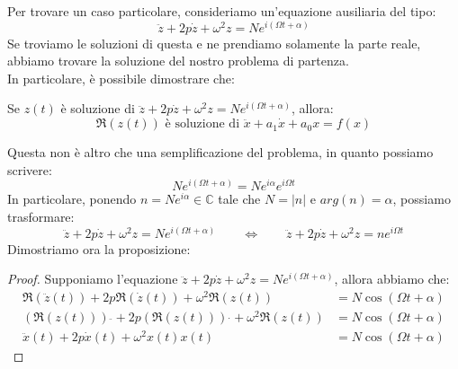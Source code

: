 \documentclass[11pt,a4paper,twoside]{article}
\theoremstyle{definition}
\begin{document}
Per trovare un caso particolare, consideriamo un'equazione ausiliaria del tipo:
\[ \ddot z + 2p \dot z + \omega^2z = Ne^{i(\Omega t + \alpha)} \]
Se troviamo le soluzioni di questa e ne prendiamo solamente la parte reale, abbiamo trovare la soluzione del nostro problema di partenza.\\
In particolare, è possibile dimostrare che:

\begin{prop}{}{}
	Se $z(t)$ è soluzione di $\ddot z + 2p \dot z + \omega^2z = Ne^{i(\Omega t + \alpha)}$, allora:
	\[\Re(z(t)) \text{ è soluzione di }\ddot x + a_1 \dot x + a_0 x = f(x)\]
\end{prop}

Questa non è altro che una semplificazione del problema, in quanto possiamo scrivere:
\[ Ne^{i(\Omega t+ \alpha)} = Ne^{i \alpha} e^{i \Omega t} \]
In particolare, ponendo $n = Ne^{i \alpha} \in \mathbb C$ tale che $N = |n|$ e $arg(n) = \alpha$, possiamo trasformare:
\[ \ddot z + 2p \dot z + \omega^2z = Ne^{i(\Omega t + \alpha)} \qquad \Leftrightarrow \qquad \ddot z+ 2p \dot z + \omega^2z = ne^{i \Omega t} \]
Dimostriamo ora la proposizione:

\begin{proof}
	Supponiamo l'equazione $\ddot z + 2p \dot z + \omega^2z = Ne^{i(\Omega t + \alpha)}$, allora abbiamo che:
	\begin{align*}
		\Re(\ddot z(t)) + 2p \Re(\dot z(t)) + \omega^2 \Re(z(t)) &= N \cos(\Omega t + \alpha)\\
		(\Re (z(t)))\;\ddot{} + 2p(\Re(z(t)))\;\dot{} + \omega^2 \Re(z(t)) &= N\cos(\Omega t + \alpha)\\
		\ddot x(t) + 2p \dot x(t) + \omega^2 x(t) x(t) &= N\cos(\Omega t + \alpha)
	\end{align*}
\end{proof}
\end{document}
